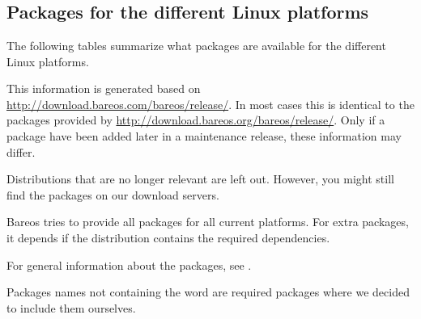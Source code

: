 % 

\section{}

\subsection{Packages for the different Linux platforms}
\label{sec:packages}

The following tables summarize what packages are available for the different Linux platforms.

This information is generated based on \url{http://download.bareos.com/bareos/release/}.
In most cases this is identical to the packages provided by \url{http://download.bareos.org/bareos/release/}.
Only if a package have been added later in a maintenance release, these information may differ.

Distributions that are no longer relevant are left out.
However, you might still find the packages on our download servers.

Bareos tries to provide all packages for all current platforms.
For extra packages, it depends if the distribution contains the required dependencies.

For general information about the packages, see .

Packages names not containing the word  are required packages where we decided to include them ourselves.

{
    \small
    
    
    
    
    
    
}






